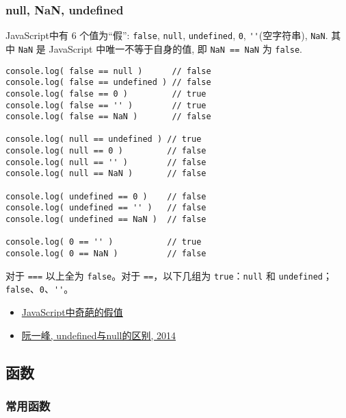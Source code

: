 \subsubsection{null, NaN, undefined}\label{null-nan-undefined}

JavaScript中有 6 个值为``假'': \lstinline!false!, \lstinline!null!,
\lstinline!undefined!, \lstinline!0!, \lstinline!''!(空字符串),
\lstinline!NaN!. 其中 \lstinline!NaN! 是 JavaScript
中唯一不等于自身的值, 即 \lstinline!NaN == NaN! 为 \lstinline!false!.

\begin{lstlisting}
console.log( false == null )      // false
console.log( false == undefined ) // false
console.log( false == 0 )         // true
console.log( false == '' )        // true
console.log( false == NaN )       // false

console.log( null == undefined ) // true
console.log( null == 0 )         // false
console.log( null == '' )        // false
console.log( null == NaN )       // false

console.log( undefined == 0 )    // false
console.log( undefined == '' )   // false
console.log( undefined == NaN )  // false

console.log( 0 == '' )           // true
console.log( 0 == NaN )          // false
\end{lstlisting}

对于 \lstinline!===! 以上全为 \lstinline!false!。对于
\lstinline!==!，以下几组为 \lstinline!true!：\lstinline!null! 和
\lstinline!undefined!；\lstinline!false!、\lstinline!0!、\lstinline!''!。

\begin{itemize}
\tightlist
\item
  \href{http://www.cnblogs.com/snandy/p/3589517.html}{JavaScript中奇葩的假值}
\item
  \href{http://www.ruanyifeng.com/blog/2014/03/undefined-vs-null.html}{阮一峰,
  undefined与null的区别, 2014}
\end{itemize}

\subsection{函数}\label{ux51fdux6570}

\subsubsection{常用函数}\label{ux5e38ux7528ux51fdux6570}

